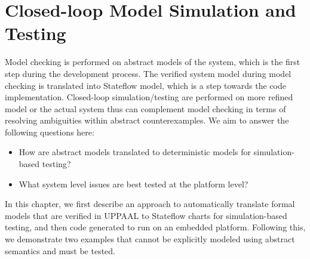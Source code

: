\chapter{Closed-loop Model Simulation and Testing}
Model checking is performed on abstract models of the system, which is the first step during the development process. The verified system model during model checking is translated into Stateflow model, which is a step towards the code implementation. Closed-loop simulation/testing are performed on more refined model or the actual system thus can complement model checking in terms of resolving ambiguities within abstract counterexamples. We aim to answer the following questions here:

\begin{itemize}
	\vspace{-5pt}
	\item How are abstract models translated to deterministic models for simulation-based testing?
	\vspace{-5pt}
	\item What system level issues are best tested at the platform level?
\end{itemize}

In this chapter, we first describe an approach to automatically translate formal models that are verified in UPPAAL to Stateflow charts for simulation-based testing, and then code generated to run on an embedded platform. Following this, we demonstrate two examples that cannot be explicitly modeled using abstract semantics and must be tested.

